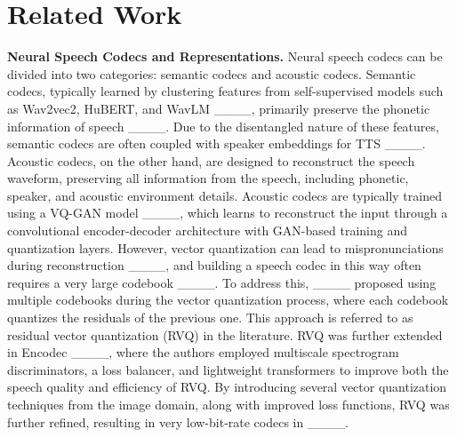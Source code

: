 \section{Related Work}
{\bf Neural Speech Codecs and Representations.}  Neural speech codecs can be divided into two categories: semantic codecs and acoustic codecs. Semantic codecs, typically learned by clustering features from self-supervised models such as Wav2vec2, HuBERT, and WavLM ____, primarily preserve the phonetic information of speech ____. Due to the disentangled nature of these features, semantic codecs are often coupled with speaker embeddings for TTS ____.
Acoustic codecs, on the other hand, are designed to reconstruct the speech waveform, preserving all information from the speech, including phonetic, speaker, and acoustic environment details. Acoustic codecs are typically trained using a VQ-GAN model ____, which learns to reconstruct the input through a convolutional encoder-decoder architecture with GAN-based training and quantization layers.
However, vector quantization can lead to mispronunciations during reconstruction ____, and building a speech codec in this way often requires a very large codebook ____.
To address this, ____ proposed using multiple codebooks during the vector quantization process, where each codebook quantizes the residuals of the previous one. This approach is referred to as residual vector quantization (RVQ) in the literature. RVQ was further extended in Encodec ____, where the authors employed multiscale spectrogram discriminators, a loss balancer, and lightweight transformers to improve both the speech quality and efficiency of RVQ. By introducing several vector quantization techniques from the image domain, along with improved loss functions, RVQ was further refined, resulting in very low-bit-rate codecs in ____.

